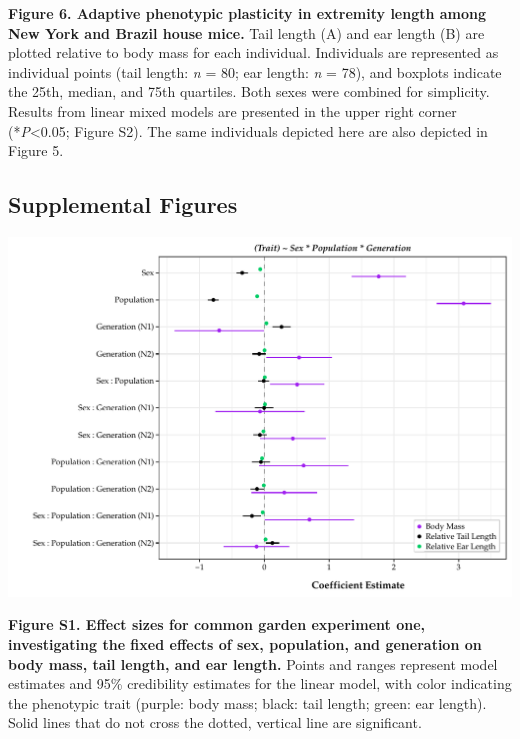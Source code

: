 \documentclass[]{article}
\begin{document}
\textbf{Figure 6. Adaptive phenotypic plasticity in extremity length
among New York and Brazil house mice.} Tail length (A) and ear length
(B) are plotted relative to body mass for each individual. Individuals
are represented as individual points (tail length: \emph{n} = 80; ear
length: \emph{n} = 78), and boxplots indicate the 25th, median, and 75th
quartiles. Both sexes were combined for simplicity. Results from linear
mixed models are presented in the upper right corner
(*\emph{P}\textless{}0.05; Figure S2). The same individuals depicted
here are also depicted in Figure 5.

\newpage

\hypertarget{supplemental-figures}{%
\subsection{Supplemental Figures}\label{supplemental-figures}}

\includegraphics{../results/figures/GenerationsModel_relative.pdf}

\textbf{Figure S1. Effect sizes for common garden experiment one,
investigating the fixed effects of sex, population, and generation on
body mass, tail length, and ear length.} Points and ranges represent
model estimates and 95\% credibility estimates for the linear model,
with color indicating the phenotypic trait (purple: body mass; black:
tail length; green: ear length). Solid lines that do not cross the
dotted, vertical line are significant.

\newpage
\end{document}
